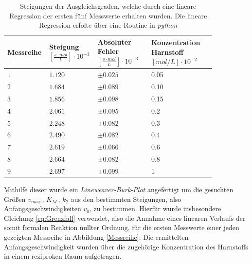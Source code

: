 \begin{table}[H]
\centering
\label{Steigungstabelle}
	\caption{Steigungen der Ausgleichsgraden, welche durch eine lineare Regression der ersten fünf Messwerte erhalten wurden. Die lineare Regression erfolte über eine Routine in \textit{python}}
	\begin{tabular}{C{0.15\linewidth}|C{0.15\linewidth}C{0.25\linewidth}C{0.3\linewidth}}
		Messreihe  &  Steigung $\left[\si{\frac{s\cdot mol}{L}}\right] \cdot 10^{-3}$ &  Absoluter Fehler $\left[\si{\frac{s \cdot mol}{L}}\right] \cdot 10^{-3}$ & Konzentration Harnstoff $\left[\si{mol/L}\right]\cdot 10^{-2}$ \\
		\hline \addlinespace[1ex] 
		$ 1$ & $1.120$ & $\pm 0.025$ & 0.05\\
		$2$ & $1.684$& $ \pm 0.089$ &0.10\\
		$3$ & $1.856$& $\pm 0.098$ &0.15\\
		$4$ &$2.061$& $\pm 0.095$&0.2\\
		$5$&  $2.248$&  $\pm 0.082$ &0.3\\
		$6$&  $2.490$&  $\pm 0.082$&0.4\\
		$7$ &  $2.619$&$\pm 0.066$&0.6\\
		$8$ & $2.664$&$\pm  0.082$ &0.8\\
		$9$ &  $2.697$& $\pm 0.099$ &1\\
	\end{tabular}
\end{table}
Mithilfe dieser wurde ein \textit{Lineweaver-Burk-Plot} angefertigt um die gesuchten Größen $v_{max}\, , \, K_M\, ,\, k_2$ aus den bestimmten Steigungen, also Anfangsgeschwindigkeiten $v_0$, zu bestimmen. Hierfür wurde insbesondere Gleichung \ref{eq:Grenzfall} verwendet, also die Annahme eines linearen Verlaufs der somit formalen Reaktion nullter Ordnung, für die ersten Messwerte einer jeden gezeigten Messreihe in Abbildung \ref{Messreihe}. Die ermittelten Anfangsgeschwindigkeit wurden über die zugehörige Konzentration des Harnstoffs in einem reziproken Raum aufgetragen.
